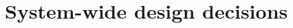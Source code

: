 \documentclass[Main]{subfiles}
\begin{document}
\chapter{System-wide design decisions}
\end{document}
